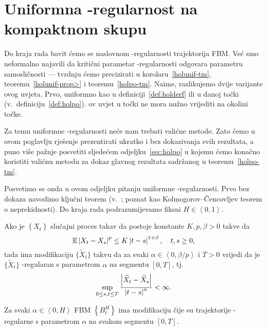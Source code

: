 \documentclass[main.tex]{subfiles}
\begin{document}
\nocite{*}

\section{Uniformna \holder -regularnost na kompaktnom skupu}\label{sec:holunif}
Do kraja rada bavit ćemo se naslovnom \holder -regularnosti
trajektorija FBM. Već smo neformalno najavili da kritični parametar \holder -regularnosti
odgovara parametru samosličnosti --- tvrdnju ćemo precizirati u
korolaru~\ref{holunif-tm}, teoremu~\ref{holunif-prop>} i teoremu~\ref{holpo-tm}. Naime,
razlikujemo dvije varijante \holder ovog uvjeta. Prvo, uniformno
kao u definiciji~\ref{def:holderf} ili u danoj točki
(v.\ definiciju~\ref{def:holpo}). \holder ov uvjet u točki ne mora nužno
vrijediti na okolini točke.

Za temu uniformne \holder -regularnosti neće nam trebati
valićne metode. Zato ćemo u ovom poglavlju rješenje prezentirati
ukratko i bez dokazivanja svih rezultata, a puno više pažnje
posvetiti sljedećem odjeljku~\ref{sec:holpo} u kojemu
ćemo konačno koristiti valićnu metodu za dokaz glavnog rezultata sadržanog
u teoremu~\ref{holpo-tm}.

Posvetimo se onda u ovom odjeljku pitanju uniformne \holder -regularnosti.
Prvo bez dokaza navodimo ključni teorem (v.~\cite[tm.~3.1]{se}; poznat kao Kolmogorov--Čencovljev teorem o neprekidnosti). Do kraja
rada podrazumijevamo fiksni \( H \in \left\langle 0,1 \right\rangle \).

\begin{teorem}\label{holunif-setm}
	Ako je \( \left\{ X_t \right\} \) slučajni proces takav da
	postoje konstante \( K, p, \beta > 0 \) takve da
	\begin{equation}
		\mathbb{E} \left| {X_t-X_s} \right|^p \le K \left| {t-s} \right|^{1+\beta}, \quad t,s \ge 0,
	\end{equation}
	tada ima modifikaciju \( \bigl\{ \widetilde X_t \bigr\} \)
	takvu da za svaki \( \alpha \in \left\langle 0, \beta/p \right\rangle \)
	i \( T > 0 \) vrijedi da je \( \bigl\{ \widetilde X_t \bigr\} \)
	\holder-regularan s parametrom \( \alpha \) na segmentu \( \left[ 0,T \right] \), tj.\
	\begin{equation}
		\sup\limits_{0 \le s, t \le T}
		\frac{\left| {\widetilde X_t-\widetilde X_s} \right|}{\left| {t-s} \right|^\alpha} < \infty.
	\end{equation}
\end{teorem}

\begin{korolar}\label{holunif-tm}
	Za svaki \( \alpha \in \left\langle0,H\right\rangle  \) FBM \( \left\{ B^H_t \right\} \) ima modifikaciju
	čije su trajektorije \holder -regularne s parametrom \( \alpha \) na svakom segmentu
	\( \left[ 0,T \right] \).
\end{korolar}
\end{document}
